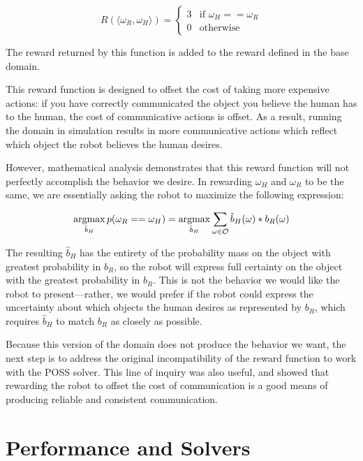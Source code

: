 \documentclass{article}
\begin{document}
\begin{equation*}
	R(\langle \omega_R, \omega_H\rangle) = \begin{cases}
		3  & \text{if } \omega_H == \omega_R \\
		0  & \text{otherwise}
	\end{cases}
\end{equation*}

The reward returned by this function is added to the reward defined in the base domain. 

This reward function is designed to offset the cost of taking more expensive actions: if you have correctly communicated the object you believe the human has to the human, the cost of communicative actions is offset. As a result, running the domain in simulation results in more communicative actions which reflect which object the robot believes the human desires. 

However, mathematical analysis demonstrates that this reward function will not perfectly accomplish the behavior we desire. In rewarding $\omega_H$ and $\omega_R$ to be the same, we are essentially asking the robot to maximize the following expression: 


\newcommand{\argmax}{\operatornamewithlimits{argmax}}
\newcommand{\argmin}{\operatornamewithlimits{argmin}}

$$ \argmax_{\hat b_H} p(\omega_R == \omega_H) = \argmax_{\hat b_H} \sum_{\omega \in \mathcal{O}}  \hat b_H(\omega) * b_R(\omega)$$

The resulting $\hat b_H$ has the entirety of the probability mass on the object with greatest probability in $b_R$, so the robot will express full certainty on the object with the greatest probability in $b_R$. This is not the behavior we would like the robot to present---rather, we would prefer if the robot could express the uncertainty about which objects the human desires as represented by $b_R$, which requires $\hat b_H$ to match $b_R$ as closely as possible.

Because this version of the domain does not produce the behavior we want, the next step is to address the original incompatibility of the reward function to work with the POSS solver. This line of inquiry was also useful, and showed that rewarding the robot to offset the cost of communication is a good means of producing reliable and consistent communication. 


\section{Performance and Solvers}
\end{document}
